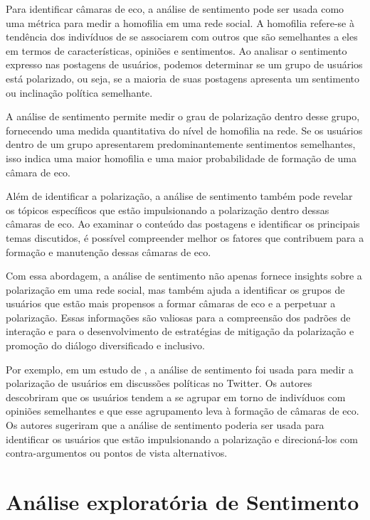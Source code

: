 Para identificar câmaras de eco, a análise de sentimento pode ser usada como uma métrica para medir a homofilia em uma rede social. A homofilia refere-se à tendência dos indivíduos de se associarem com outros que são semelhantes a eles em termos de características, opiniões e sentimentos. Ao analisar o sentimento expresso nas postagens de usuários, podemos determinar se um grupo de usuários está polarizado, ou seja, se a maioria de suas postagens apresenta um sentimento ou inclinação política semelhante.

A análise de sentimento permite medir o grau de polarização dentro desse grupo, fornecendo uma medida quantitativa do nível de homofilia na rede. Se os usuários dentro de um grupo apresentarem predominantemente sentimentos semelhantes, isso indica uma maior homofilia e uma maior probabilidade de formação de uma câmara de eco.

Além de identificar a polarização, a análise de sentimento também pode revelar os tópicos específicos que estão impulsionando a polarização dentro dessas câmaras de eco. Ao examinar o conteúdo das postagens e identificar os principais temas discutidos, é possível compreender melhor os fatores que contribuem para a formação e manutenção dessas câmaras de eco.

Com essa abordagem, a análise de sentimento não apenas fornece insights sobre a polarização em uma rede social, mas também ajuda a identificar os grupos de usuários que estão mais propensos a formar câmaras de eco e a perpetuar a polarização. Essas informações são valiosas para a compreensão dos padrões de interação e para o desenvolvimento de estratégias de mitigação da polarização e promoção do diálogo diversificado e inclusivo.

Por exemplo, em um estudo de , a análise de sentimento foi usada para medir a polarização de usuários em discussões políticas no Twitter. Os autores descobriram que os usuários tendem a se agrupar em torno de indivíduos com opiniões semelhantes e que esse agrupamento leva à formação de câmaras de eco. Os autores sugeriram que a análise de sentimento poderia ser usada para identificar os usuários que estão impulsionando a polarização e direcioná-los com contra-argumentos ou pontos de vista alternativos.

\section{Análise exploratória de Sentimento}

